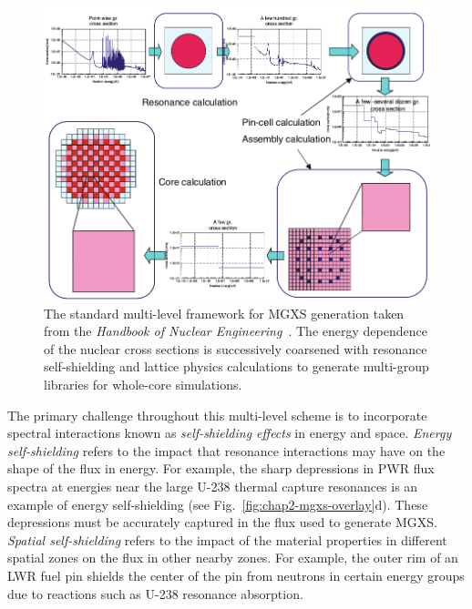 \begin{figure}[h!]
  \centering
  \includegraphics[width=0.9\linewidth]{figures/mgxs/nuke-handbook-mgxs-process}
\caption[Standard multi-level framework for MGXS generation]{The standard multi-level framework for \ac{MGXS} generation taken from the \textit{Handbook of Nuclear Engineering}~\cite{cacuci2010handbook}. The energy dependence of the nuclear cross sections is successively coarsened with resonance self-shielding and lattice physics calculations to generate multi-group libraries for whole-core simulations.}
\label{fig:chap2-mgxs-process}
\end{figure}


The primary challenge throughout this multi-level scheme is to incorporate spectral interactions known as \textit{self-shielding effects} in energy and space. \textit{Energy self-shielding} refers to the impact that resonance interactions may have on the shape of the flux in energy. For example, the sharp depressions in \ac{PWR} flux spectra at energies near the large U-238 thermal capture resonances is an example of energy self-shielding (see Fig.~\ref{fig:chap2-mgxs-overlay}d). These depressions must be accurately captured in the flux used to generate \ac{MGXS}. \textit{Spatial self-shielding} refers to the impact of the material properties in different spatial zones on the flux in other nearby zones. For example, the outer rim of an \ac{LWR} fuel pin shields the center of the pin from neutrons in certain energy groups due to reactions such as U-238 resonance absorption.

